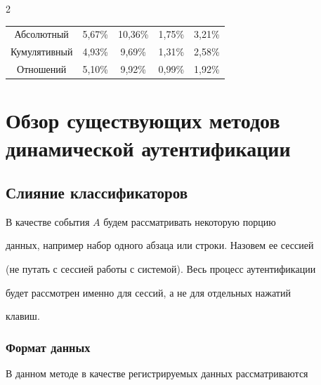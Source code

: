 \begin{multicols}{2}
\begin{center}
{\begin{tabular}{|c|c|c|c|c|}
\hline

Абсолютный  & 5,67\%   & 10,36\% & 1,75\%  & 3,21\% \\


Кумулятивный  & 4,93\%   & \hphantom{9}9,69\% & 1,31\%  & 2,58\% \\


Отношений      & 5,10\%   & \hphantom{9}9,92\% & 0,99\%  & 1,92\%\\

\hline

\end{tabular}

   }

\end{center}

            

\vspace*{6pt}



        \addtocounter{table}{2}



 \section{Обзор существующих методов динамической аутентификации}



\subsection{Слияние классификаторов}



В качестве события $A$  будем рассматривать некоторую порцию

данных, например набор одного абзаца или строки. Назовем ее сессией

(не путать с сессией работы с системой). Весь процесс аутентификации

будет рассмотрен именно для сессий, а не для отдельных нажатий

клавиш.



\subsubsection{Формат данных}



В данном методе в качестве регистрируемых данных рассматриваются


\end{multicols}
